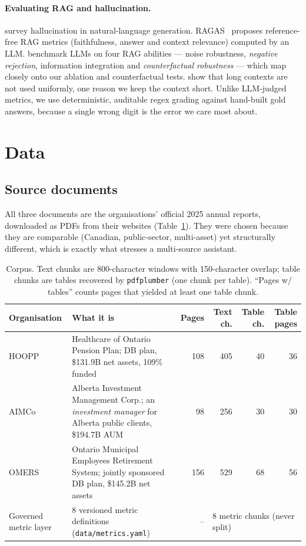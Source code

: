 \documentclass[11pt,a4paper]{article}
\begin{document}
\paragraph{Evaluating RAG and hallucination.}
\citet{ji2023hallucination} survey hallucination in natural-language generation. RAGAS~\citep{es2023ragas}
proposes reference-free RAG metrics (faithfulness, answer and context relevance) computed by an LLM.
\citet{chen2024rgb} benchmark LLMs on four RAG abilities --- noise robustness, \emph{negative rejection},
information integration and \emph{counterfactual robustness} --- which map closely onto our ablation and
counterfactual tests. \citet{liu2024lost} show that long contexts are not used uniformly, one reason we keep the
context short. Unlike LLM-judged metrics, we use deterministic, auditable regex grading against hand-built gold
answers, because a single wrong digit is the error we care most about.

\section{Data}
\label{sec:data}

\subsection{Source documents}
All three documents are the organisations' official 2025 annual reports, downloaded as PDFs from their websites
(Table~\ref{tab:corpus}). They were chosen because they are comparable (Canadian, public-sector, multi-asset) yet
structurally different, which is exactly what stresses a multi-source assistant.

\begin{table}[H]
\centering\small
\caption{Corpus. Text chunks are 800-character windows with 150-character overlap; table chunks are tables recovered
by \texttt{pdfplumber} (one chunk per table). ``Pages w/ tables'' counts pages that yielded at least one table chunk.}
\label{tab:corpus}
\setlength{\tabcolsep}{4pt}
\begin{tabular}{lp{4.6cm}rrrr}
\toprule
Organisation & What it is & Pages & Text ch. & Table ch. & Table pages\\
\midrule
HOOPP & Healthcare of Ontario Pension Plan; DB plan, \$131.9B net assets, 109\% funded & 108 & 405 & 40 & 36\\
AIMCo & Alberta Investment Management Corp.; an \emph{investment manager} for Alberta public clients, \$194.7B AUM & 98 & 256 & 30 & 30\\
OMERS & Ontario Municipal Employees Retirement System; jointly sponsored DB plan, \$145.2B net assets & 156 & 529 & 68 & 56\\
\midrule
Governed metric layer & 8 versioned metric definitions (\texttt{data/metrics.yaml}) & -- & \multicolumn{3}{l}{8 metric chunks (never split)}\\
\bottomrule
\end{tabular}
\end{table}
\end{document}
